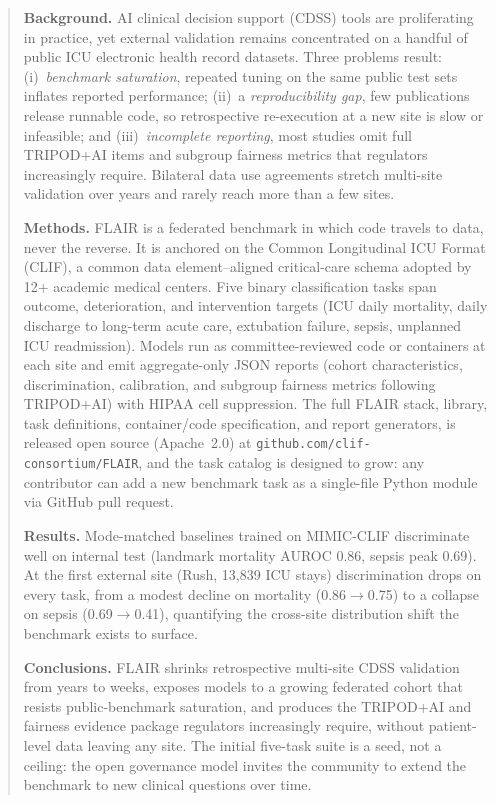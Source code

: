 \begin{abstract}
\noindent\textbf{Background.} AI clinical decision support (CDSS)
tools are proliferating in practice, yet external validation remains
concentrated on a handful of public ICU electronic health record
datasets. Three problems result: (i)~\emph{benchmark
saturation}, repeated tuning on the same public test sets inflates
reported performance; (ii)~a \emph{reproducibility gap}, few
publications release runnable code, so retrospective re-execution at a
new site is slow or infeasible; and (iii)~\emph{incomplete
reporting}, most studies omit full TRIPOD+AI items and subgroup
fairness metrics that regulators increasingly require. Bilateral data
use agreements stretch multi-site validation over years and rarely
reach more than a few sites.

\noindent\textbf{Methods.} FLAIR is a federated benchmark in which
code travels to data, never the reverse. It is anchored on the Common
Longitudinal ICU Format (CLIF), a common data element--aligned
critical-care schema adopted by 12+ academic medical centers. Five
binary classification tasks span outcome, deterioration, and
intervention targets (ICU daily mortality, daily discharge to
long-term acute care, extubation failure, sepsis, unplanned ICU
readmission). Models run as committee-reviewed code or containers at each
site and emit aggregate-only JSON reports (cohort characteristics,
discrimination, calibration, and subgroup fairness metrics following
TRIPOD+AI) with HIPAA cell suppression. The full FLAIR stack, library, task
definitions, container/code specification, and report generators, is
released open source (Apache~2.0) at
\texttt{github.com/clif-consortium/FLAIR}, and the task catalog is
designed to grow: any contributor can add a new benchmark task as a
single-file Python module via GitHub pull request.

\noindent\textbf{Results.} Mode-matched baselines trained on MIMIC-CLIF
discriminate well on internal test (landmark mortality AUROC 0.86,
sepsis peak 0.69). At the first external site (Rush, 13{,}839 ICU
stays) discrimination drops on every task, from a modest decline on
mortality (0.86$\rightarrow$0.75) to a collapse on sepsis
(0.69$\rightarrow$0.41), quantifying the cross-site distribution shift
the benchmark exists to surface.

\noindent\textbf{Conclusions.} FLAIR shrinks retrospective multi-site
CDSS validation from years to weeks, exposes models to a growing
federated cohort that resists public-benchmark saturation, and
produces the TRIPOD+AI and fairness evidence package regulators
increasingly require, without patient-level data leaving any site.
The initial five-task suite is a seed, not a ceiling: the open
governance model invites the community to extend the benchmark to
new clinical questions over time.
\end{abstract}
